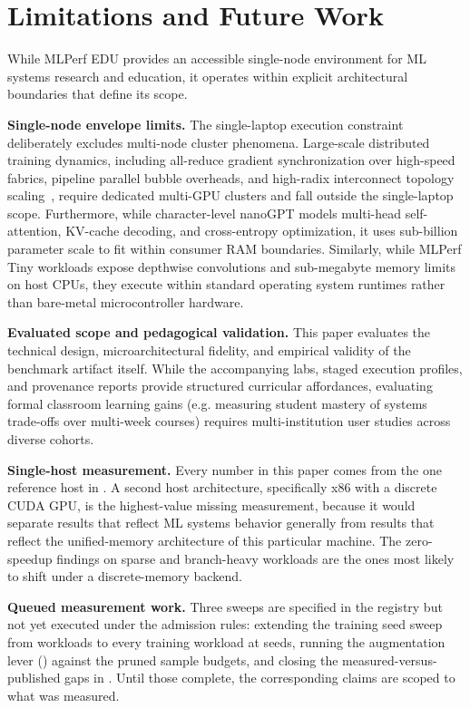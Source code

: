 \documentclass[10pt,twocolumn]{article}
\begin{document}
\section{Limitations and Future Work}
\label{sec:limitations}

While MLPerf EDU provides an accessible single-node environment for ML systems research and education, it operates within explicit architectural boundaries that define its scope.

\textbf{Single-node envelope limits.} The single-laptop execution constraint deliberately excludes multi-node cluster phenomena. Large-scale distributed training dynamics, including all-reduce gradient synchronization over high-speed fabrics, pipeline parallel bubble overheads, and high-radix interconnect topology scaling~\citep{jouppi2021}, require dedicated multi-GPU clusters and fall outside the single-laptop scope. Furthermore, while character-level nanoGPT models multi-head self-attention, KV-cache decoding, and cross-entropy optimization, it uses sub-billion parameter scale to fit within consumer RAM boundaries. Similarly, while MLPerf Tiny workloads expose depthwise convolutions and sub-megabyte memory limits on host CPUs, they execute within standard operating system runtimes rather than bare-metal microcontroller hardware.

\textbf{Evaluated scope and pedagogical validation.} This paper evaluates the technical design, microarchitectural fidelity, and empirical validity of the benchmark artifact itself. While the accompanying labs, staged execution profiles, and provenance reports provide structured curricular affordances, evaluating formal classroom learning gains (e.g. measuring student mastery of systems trade-offs over multi-week courses) requires multi-institution user studies across diverse cohorts.

\textbf{Single-host measurement.} Every number in this paper comes from the one reference host in . A second host architecture, specifically x86 with a discrete CUDA GPU, is the highest-value missing measurement, because it would separate results that reflect ML systems behavior generally from results that reflect the unified-memory architecture of this particular machine. The zero-speedup findings on sparse and branch-heavy workloads are the ones most likely to shift under a discrete-memory backend.

\textbf{Queued measurement work.} Three sweeps are specified in the registry but not yet executed under the admission rules: extending the training seed sweep from \TrainingSeedWorkloads{} workloads to every training workload at \DeterminismSeeds{} seeds, running the augmentation lever () against the pruned sample budgets, and closing the \FunctionalSetupWorkloads{} measured-versus-published gaps in . Until those complete, the corresponding claims are scoped to what was measured.
\end{document}
